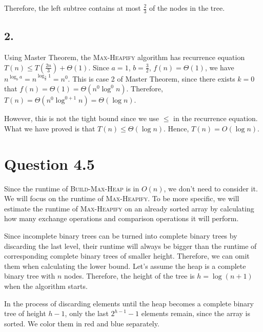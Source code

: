 \documentclass[a4paper,12pt]{article}
\begin{document}
Therefore, the left subtree contains at most $\frac{2}{3}$ of the nodes in the tree.

\subsection*{2.}
Using Master Theorem, the \textsc{Max-Heapify} algorithm has recurrence equation $T(n) \leq T(\frac{2n}{3}) + \Theta(1)$.
Since $a = 1$, $b = \frac{3}{2}$, $f(n) = \Theta(1)$, we have $n^{\log_b a} = n^{\log_{\frac{3}{2}} 1} = n^0$.
This is case 2 of Master Theorem, since there exists $k = 0$ that $f(n) = \Theta(1) = \Theta(n^0 \log^0 n)$.
Therefore, $T(n) = \Theta(n^0 \log^{0+1} n) = \Theta(\log n)$. 

However, this is not the tight bound since we use $\leq$ in the recurrence equation.
What we have proved is that $T(n) \leq \Theta(\log n)$.
Hence, $T(n) = O(\log n)$.

\section*{Question 4.5}

Since the runtime of \textsc{Build-Max-Heap} is in $O(n)$, we don't need to consider it.
We will focus on the runtime of \textsc{Max-Heapify}.
To be more specific, we will estimate the runtime of \textsc{Max-Heapify} on an already sorted array by calculating how many exchange operations and comparison operations it will perform.

Since incomplete binary trees can be turned into complete binary trees by discarding the last level, their runtime will always be bigger than the runtime of corresponding complete binary trees of smaller height.
Therefore, we can omit them when calculating the lower bound.
Let's assume the heap is a complete binary tree with $n$ nodes.
Therefore, the height of the tree is $h = \log (n+1)$ when the algorithm starts.

In the process of discarding elements until the heap becomes a complete binary tree of height $h - 1$, only the last $2^{h - 1} - 1$ elements remain, since the array is sorted.
We color them in red and blue separately.
\end{document}
